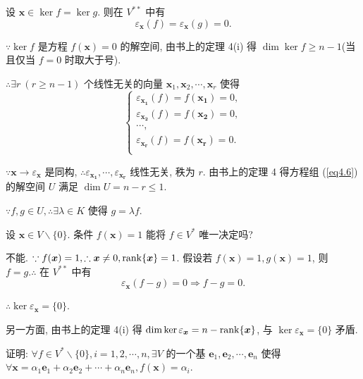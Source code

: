 \documentclass[color=black,device=normal,lang=cn,mode=geye]{elegantnote}
\begin{document}
\begin{solution}
    设 $\boldsymbol{x}\in\ker f=\ker g$. 则在 $V^{**}$ 中有
    \[\varepsilon_{\boldsymbol{x}}(f)=\varepsilon_{\boldsymbol{x}}(g)=0.\]

    $\because\ker f$ 是方程 $f(\boldsymbol{x})=0$ 的解空间, 由书上的定理 4(i) 得 $\dim\ker f\geq n-1$(当且仅当 $f=0$ 时取大于号).

    $\therefore\exists r\ (r\geq n-1)$ 个线性无关的向量 $\boldsymbol{x}_1,\boldsymbol{x}_2,\cdots,\boldsymbol{x}_r$ 使得
    \begin{equation}\label{eq4.6}
        \begin{cases}
            \varepsilon_{\boldsymbol{x_1}}(f)=f(\boldsymbol{x_1})=0, \\
            \varepsilon_{\boldsymbol{x_2}}(f)=f(\boldsymbol{x_2})=0, \\
            \cdots, \\
            \varepsilon_{\boldsymbol{x_r}}(f)=f(\boldsymbol{x_r})=0. \\
        \end{cases}
    \end{equation}

    $\because\boldsymbol{x}\to\varepsilon_{\boldsymbol{x}}$ 是同构, $\therefore\varepsilon_{\boldsymbol{x_1}},\cdots,\varepsilon_{\boldsymbol{x_r}}$ 线性无关, 秩为 $r$. 由书上的定理 4 得方程组 (\ref{eq4.6}) 的解空间 $U$ 满足 $\dim U=n-r\leq 1$.

    $\because f,g\in U,\therefore\exists\lambda\in K$ 使得 $g=\lambda f$.
\end{solution}
\begin{exercise}%
    设 $\boldsymbol{x}\in V\backslash\{0\}$. 条件 $f(\boldsymbol{x})=1$ 能将 $f\in V^*$ 唯一决定吗?
\end{exercise}
\begin{solution}
    不能. $\because f(\boldsymbol{x})=1,\therefore\boldsymbol{x}\neq0,\operatorname{rank} \{\boldsymbol{x}\}=1$. 假设若 $f(\boldsymbol{x})=1,g(\boldsymbol{x})=1$, 则 $f=g.\therefore$ 在 $V^{**}$ 中有
    \[\varepsilon_{\boldsymbol{x}}(f-g)=0\Rightarrow f-g=0.\]

    $\therefore\ker\varepsilon_{\boldsymbol{x}}=\{0\}$.
    
    另一方面, 由书上的定理 4(i) 得 $\dim\ker\varepsilon_{\boldsymbol{x}}=n-\operatorname{rank} \{\boldsymbol{x}\}$, 与 $\ker\varepsilon_{\boldsymbol{x}}=\{0\}$ 矛盾.
\end{solution}
\begin{exercise}%
    证明: $\forall f\in V^*\backslash\{0\},i=1,2,\cdots,n,\exists V$ 的一个基 $\boldsymbol{e}_1,\boldsymbol{e}_2,\cdots,\boldsymbol{e}_n$ 使得 $\forall\boldsymbol{x}=\alpha_1\boldsymbol{e}_1+\alpha_2\boldsymbol{e}_2+\cdots+\alpha_n\boldsymbol{e}_n,f(\boldsymbol{x})=\alpha_i$.
\end{exercise}
\end{document}
